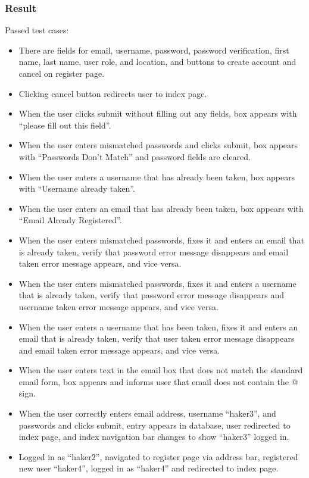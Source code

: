 \subsubsection{Result}
Passed test cases:
\begin{itemize}
\item There are fields for email, username, password, password verification, first name, last name, user role, and location, and buttons to create account and cancel on register page.
\item Clicking cancel button redirects user to index page.
\item When the user clicks submit without filling out any fields, box appears with ``please fill out this field''.
\item When the user enters mismatched passwords and clicks submit, box appears with ``Passwords Don't Match'' and password fields are cleared.
\item When the user enters a username that has already been taken, box appears with ``Username already taken''.
\item When the user enters an email that has already been taken, box appears with ``Email Already Registered''.
\item When the user enters mismatched passwords, fixes it and enters an email that is already taken, verify that password error message disappears and email taken error message appears, and vice versa.
\item When the user enters mismatched passwords, fixes it and enters a username that is already taken, verify that password error message disappears and username taken error message appears, and vice versa.
\item When the user enters a username that has been taken, fixes it and enters an email that is already taken, verify that user taken error message disappears and email taken error message appears, and vice versa.
\item When the user enters text in the email box that does not match the standard email form, box appears and informs user that email does not contain the @ sign.
\item When the user correctly enters email address, username ``haker3'', and passwords and clicks submit, entry appears in database, user redirected to index page, and index navigation bar changes to show ``haker3'' logged in.
\item Logged in as ``haker2'', navigated to register page via address bar, registered new user ``haker4'', logged in as ``haker4'' and redirected to index page.
\end{itemize}
